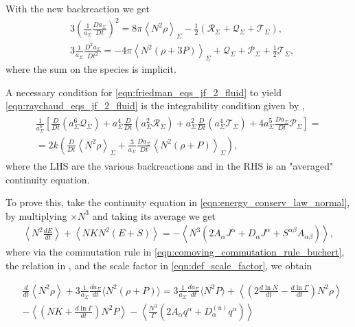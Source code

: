 With the new backreaction we get
\begin{align}
    &3\left(\frac{1}{a_\Sigma}\frac{Da_\Sigma}{Dt}\right)^2=8\pi\left\langle N^2\rho\right\rangle_{\Sigma}-\frac{1}{2}\left(\mathcal{R}_\Sigma+\mathcal{Q}_{\Sigma}+\mathcal{T}_{\Sigma}\right),\label{eqn:friedman_eqs_jf_2_fluid}\\
    &3\frac{1}{a_{\Sigma}}\frac{D^2a_{\Sigma}}{Dt^2}=-4\pi\left\langle N^2(\rho+3P)\right\rangle_{\Sigma}+\mathcal{Q}_{\Sigma}+\mathcal{P}_{\Sigma}+\frac{1}{2}\mathcal{T}_{\Sigma}\label{eqn:raychaud_eqs_jf_2_fluid},
\end{align}
where the sum on the species is implicit.

A necessary condition for \cref{eqn:friedman_eqs_jf_2_fluid} to yield \cref{eqn:raychaud_eqs_jf_2_fluid} is the integrability condition given by \cite{Buchert_2020},
\begin{align}
\begin{gathered}
\frac{1}{a_\Sigma^6}\left[\frac{D}{D t}\left(a_\Sigma^6\mathcal{Q}_{\Sigma}\right)+a_\Sigma^4\frac{D}{Dt}\left(a_\Sigma^2\mathcal{R}_{\Sigma}\right)+a_\Sigma^2\frac{D}{Dt}\left(a_\Sigma^4 \mathcal{T}_{\Sigma}\right)+4a_\Sigma^5\frac{Da_\Sigma}{Dt}\mathcal{P}_{\Sigma}\right]=\nonumber \\
=2k\left(\frac{D}{D t}\left\langle N^2 \rho\right\rangle_{\Sigma}+\frac{3}{a_{\Sigma}} \frac{D a_{\Sigma}}{D t}\left\langle N^2\left(\rho+P\right)\right\rangle_{\Sigma}\right),
\end{gathered}
\end{align}
where the LHS are the various backreactions and in the RHS is an "averaged" continuity equation. 



To prove this, take the continuity equation in \cref{eqn:energy_conserv_law_normal}, by multiplying $\times N^3$ and taking its average we get
\begin{align}
    \left\langle N^2\frac{d E}{dt}\right\rangle + \left\langle NK N^2(E+S)\right\rangle =  -\left\langle N^3\left( 2 A_\alpha J^\alpha +  D_\alpha J^\alpha+ S^{\alpha\beta}A_{\alpha\beta}\right)\right\rangle,
\end{align}
where via the commutation rule in \cref{eqn:comoving_commutation_rule_buchert}, the relation in , and the scale factor in \cref{eqn:def_scale_factor}, we obtain


\begin{align}
    &\frac{d}{dt}\left\langle N^2\rho\right\rangle+3\frac{1}{a_\Sigma}\frac{da_\Sigma}{dt}\langle N^2(\rho+P)\rangle=3\frac{1}{a_\Sigma}\frac{da_\Sigma}{dt}\langle N^2P\rangle+\left\langle \left(2\frac{d\ln N}{dt}-\frac{d\ln \Gamma}{dt}\right)N^2\rho\right\rangle\\
    &-\left\langle\left(NK+\frac{d\ln\Gamma}{dt}\right)N^2P\right\rangle-\left\langle \frac{N^3}{\Gamma}\left(2A_\alpha q^\alpha+D^{(u)}_\alpha q^\alpha\right)\right\rangle
\end{align}


